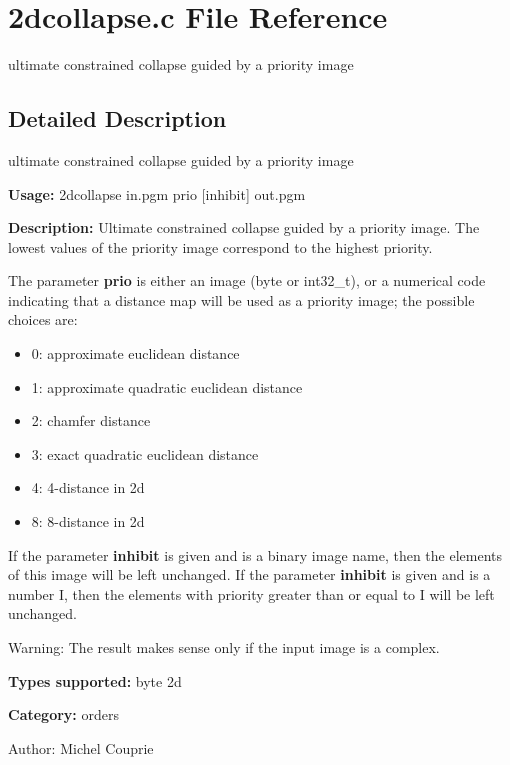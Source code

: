 \section{2dcollapse.c File Reference}
\label{2dcollapse_8c}
ultimate constrained collapse guided by a priority image 



\subsection{Detailed Description}
ultimate constrained collapse guided by a priority image 

{\bf Usage:} 2dcollapse in.pgm prio [inhibit] out.pgm

{\bf Description:} Ultimate constrained collapse guided by a priority image. The lowest values of the priority image correspond to the highest priority.

The parameter {\bf prio} is either an image (byte or int32\_\-t), or a numerical code indicating that a distance map will be used as a priority image; the possible choices are: \begin{itemize}
\item 0: approximate euclidean distance \item 1: approximate quadratic euclidean distance \item 2: chamfer distance \item 3: exact quadratic euclidean distance \item 4: 4-distance in 2d \item 8: 8-distance in 2d\end{itemize}
If the parameter {\bf inhibit} is given and is a binary image name, then the elements of this image will be left unchanged. If the parameter {\bf inhibit} is given and is a number I, then the elements with priority greater than or equal to I will be left unchanged.

\begin{Desc}
\item[Warning:]The result makes sense only if the input image is a complex.\end{Desc}
{\bf Types supported:} byte 2d

{\bf Category:} orders

\begin{Desc}
\item[Author:]Michel Couprie \end{Desc}
